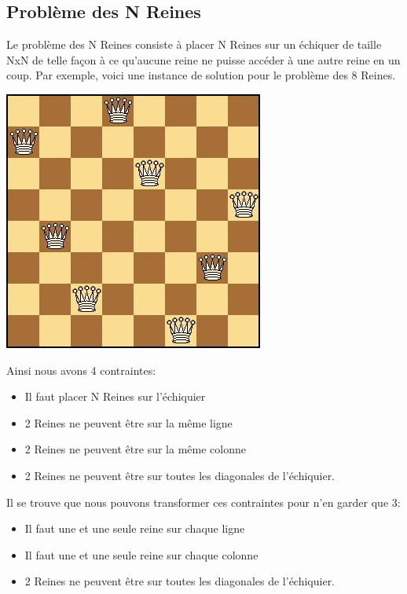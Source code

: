 \documentclass[12pt]{extarticle}
\begin{document}
\subsection{Problème des N Reines}

Le problème des N Reines consiste à placer N Reines sur un échiquer de taille NxN de telle façon à ce qu'aucune reine ne puisse accéder à une autre reine en un coup. Par exemple, voici une instance de solution pour le problème des 8 Reines.

\vspace{1em}

\begin{center}
    \includegraphics[]{huitreines.jpg}
\end{center}

\vspace{1em}

Ainsi nous avons 4 contraintes:

\begin{itemize}
    \item Il faut placer N Reines sur l'échiquier
    \item 2 Reines ne peuvent être sur la même ligne
    \item 2 Reines ne peuvent être sur la même colonne
    \item 2 Reines ne peuvent être sur toutes les diagonales de l'échiquier.
\end{itemize}

Il se trouve que nous pouvons transformer ces contraintes pour n'en garder que 3:

\begin{itemize}
    \item Il faut une et une seule reine sur chaque ligne
    \item Il faut une et une seule reine sur chaque colonne
    \item 2 Reines ne peuvent être sur toutes les diagonales de l'échiquier.
\end{itemize}
\end{document}
